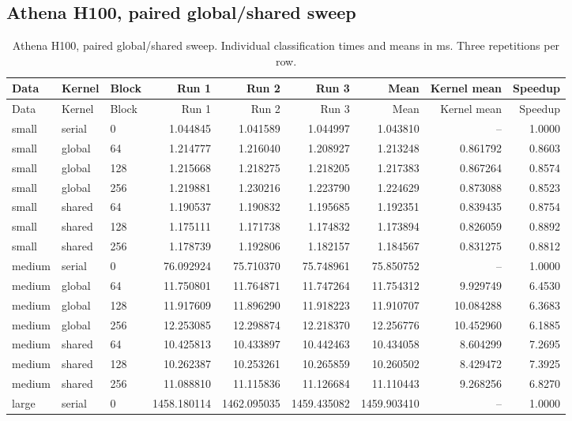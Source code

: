 \subsection{Athena H100, paired global/shared sweep}
\small
\begin{longtable}{lllrrrrrr}
\caption{Athena H100, paired global/shared sweep. Individual classification times and means in ms. Three repetitions per row.}\\
\toprule
Data & Kernel & Block & Run 1 & Run 2 & Run 3 & Mean & Kernel mean & Speedup \\
\midrule\endfirsthead
\toprule
Data & Kernel & Block & Run 1 & Run 2 & Run 3 & Mean & Kernel mean & Speedup \\
\midrule\endhead
\bottomrule\endfoot
small & serial & 0 & 1.044845 & 1.041589 & 1.044997 & 1.043810 & -- & 1.0000 \\
small & global & 64 & 1.214777 & 1.216040 & 1.208927 & 1.213248 & 0.861792 & 0.8603 \\
small & global & 128 & 1.215668 & 1.218275 & 1.218205 & 1.217383 & 0.867264 & 0.8574 \\
small & global & 256 & 1.219881 & 1.230216 & 1.223790 & 1.224629 & 0.873088 & 0.8523 \\
small & shared & 64 & 1.190537 & 1.190832 & 1.195685 & 1.192351 & 0.839435 & 0.8754 \\
small & shared & 128 & 1.175111 & 1.171738 & 1.174832 & 1.173894 & 0.826059 & 0.8892 \\
small & shared & 256 & 1.178739 & 1.192806 & 1.182157 & 1.184567 & 0.831275 & 0.8812 \\
medium & serial & 0 & 76.092924 & 75.710370 & 75.748961 & 75.850752 & -- & 1.0000 \\
medium & global & 64 & 11.750801 & 11.764871 & 11.747264 & 11.754312 & 9.929749 & 6.4530 \\
medium & global & 128 & 11.917609 & 11.896290 & 11.918223 & 11.910707 & 10.084288 & 6.3683 \\
medium & global & 256 & 12.253085 & 12.298874 & 12.218370 & 12.256776 & 10.452960 & 6.1885 \\
medium & shared & 64 & 10.425813 & 10.433897 & 10.442463 & 10.434058 & 8.604299 & 7.2695 \\
medium & shared & 128 & 10.262387 & 10.253261 & 10.265859 & 10.260502 & 8.429472 & 7.3925 \\
medium & shared & 256 & 11.088810 & 11.115836 & 11.126684 & 11.110443 & 9.268256 & 6.8270 \\
large & serial & 0 & 1458.180114 & 1462.095035 & 1459.435082 & 1459.903410 & -- & 1.0000 \\

\end{longtable}
